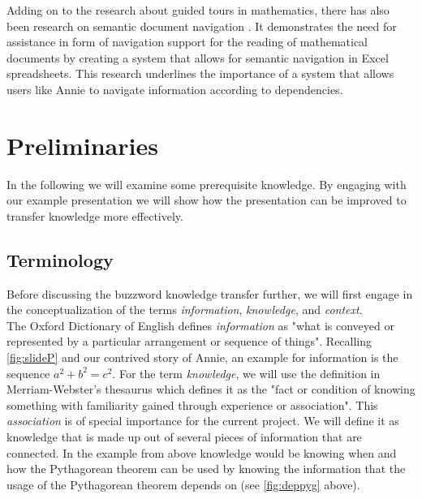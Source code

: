 \documentclass[twoside, 12pt]{article}
\begin{document}
Adding on to the research about guided tours in mathematics, there has also been research on semantic document navigation \cite{Koh:NavigationInMathDocs2012}. It demonstrates the need for assistance in form of navigation support for the reading of mathematical documents by creating a system that allows for semantic navigation in Excel spreadsheets. This research underlines the importance of a system that allows users like Annie to navigate information according to dependencies.
  
\section{Preliminaries}
\label{sec:preliminaries}

In the following we will examine some prerequisite knowledge. By engaging with our example presentation we will show how the presentation can be improved to transfer knowledge more effectively.

\subsection{Terminology}
\label{sec:terminology}

Before discussing the buzzword knowledge transfer further, we will first engage in the conceptualization of the terms \textit{information}, \textit{knowledge}, and \textit{context}.\\

The Oxford Dictionary of English \cite{OED:npentrel14} defines \textit{information} as "what is conveyed or represented by a particular arrangement or sequence of things". Recalling \autoref{fig:slideP} and our contrived story of Annie, an example for information is the sequence \textit{$a^2 + b^2 = c^2$}. For the term \textit{knowledge}, we will use the definition in Merriam-Webster's thesaurus \cite{Webster:npentrel14} which defines it as the "fact or condition of knowing something with familiarity gained through experience or association". This \textit{association} is of special importance for the current project. We will define it as knowledge that is made up out of several pieces of information that are connected. In the example from above knowledge would be knowing when and how the Pythagorean theorem can be used by knowing the information that the usage of the Pythagorean theorem depends on (see \autoref{fig:deppyg} above).\\ 
\end{document}
